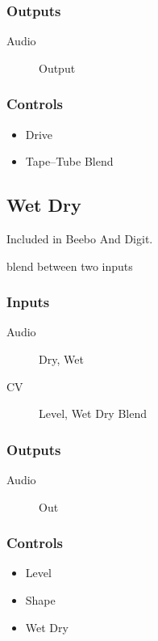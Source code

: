 \subsubsection{Outputs}
\begin{description}
\item [Audio] Output
\end{description}

\subsubsection{Controls}
\begin{itemize}
\item Drive
\item Tape--Tube Blend
\end{itemize}

\subsection{Wet Dry}

Included in Beebo And Digit.

blend between two inputs



\subsubsection{Inputs}
\begin{description}
\item [Audio] Dry, Wet
\item [CV] Level, Wet Dry Blend
\end{description}

\subsubsection{Outputs}
\begin{description}
\item [Audio] Out
\end{description}

\subsubsection{Controls}
\begin{itemize}
\item Level
\item Shape
\item Wet Dry
\end{itemize}

